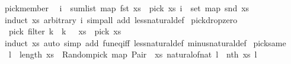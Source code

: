 \begin{isabellebody}
\isanewline
{}\isamarkupfalse%
\ pick{\isacharunderscore}{\kern0pt}member{\isacharcolon}{\kern0pt}\isanewline
\ \ {\isachardoublequoteopen}i\ {\isacharless}{\kern0pt}\ sum{\isacharunderscore}{\kern0pt}list\ {\isacharparenleft}{\kern0pt}map\ fst\ xs{\isacharparenright}{\kern0pt}\ {\isasymLongrightarrow}\ pick\ xs\ i\ {\isasymin}\ set\ {\isacharparenleft}{\kern0pt}map\ snd\ xs{\isacharparenright}{\kern0pt}{\isachardoublequoteclose}\isanewline
%
\isadelimproof
\ \ %
\endisadelimproof
%
\isatagproof
{}\isamarkupfalse%
\ {\isacharparenleft}{\kern0pt}induct\ xs\ arbitrary{\isacharcolon}{\kern0pt}\ i{\isacharparenright}{\kern0pt}\ {\isacharparenleft}{\kern0pt}simp{\isacharunderscore}{\kern0pt}all\ add{\isacharcolon}{\kern0pt}\ less{\isacharunderscore}{\kern0pt}natural{\isacharunderscore}{\kern0pt}def{\isacharparenright}{\kern0pt}%
\endisatagproof
{\isafoldproof}%
%
\isadelimproof
\isanewline
%
\endisadelimproof
\isanewline
{}\isamarkupfalse%
\ pick{\isacharunderscore}{\kern0pt}drop{\isacharunderscore}{\kern0pt}zero{\isacharcolon}{\kern0pt}\isanewline
\ \ {\isachardoublequoteopen}pick\ {\isacharparenleft}{\kern0pt}filter\ {\isacharparenleft}{\kern0pt}{\isasymlambda}{\isacharparenleft}{\kern0pt}k{\isacharcomma}{\kern0pt}\ {\isacharunderscore}{\kern0pt}{\isacharparenright}{\kern0pt}{\isachardot}{\kern0pt}\ k\ {\isachargreater}{\kern0pt}\ {}{\isacharparenright}{\kern0pt}\ xs{\isacharparenright}{\kern0pt}\ {\isacharequal}{\kern0pt}\ pick\ xs{\isachardoublequoteclose}\isanewline
%
\isadelimproof
\ \ %
\endisadelimproof
%
\isatagproof
{}\isamarkupfalse%
\ {\isacharparenleft}{\kern0pt}induct\ xs{\isacharparenright}{\kern0pt}\ {\isacharparenleft}{\kern0pt}auto\ simp\ add{\isacharcolon}{\kern0pt}\ fun{\isacharunderscore}{\kern0pt}eq{\isacharunderscore}{\kern0pt}iff\ less{\isacharunderscore}{\kern0pt}natural{\isacharunderscore}{\kern0pt}def\ minus{\isacharunderscore}{\kern0pt}natural{\isacharunderscore}{\kern0pt}def{\isacharparenright}{\kern0pt}%
\endisatagproof
{\isafoldproof}%
%
\isadelimproof
\isanewline
%
\endisadelimproof
\isanewline
{}\isamarkupfalse%
\ pick{\isacharunderscore}{\kern0pt}same{\isacharcolon}{\kern0pt}\isanewline
\ \ {\isachardoublequoteopen}l\ {\isacharless}{\kern0pt}\ length\ xs\ {\isasymLongrightarrow}\ Random{\isachardot}{\kern0pt}pick\ {\isacharparenleft}{\kern0pt}map\ {\isacharparenleft}{\kern0pt}Pair\ {}{\isacharparenright}{\kern0pt}\ xs{\isacharparenright}{\kern0pt}\ {\isacharparenleft}{\kern0pt}natural{\isacharunderscore}{\kern0pt}of{\isacharunderscore}{\kern0pt}nat\ l{\isacharparenright}{\kern0pt}\ {\isacharequal}{\kern0pt}\ nth\ xs\ l{\isachardoublequoteclose}\isanewline

\end{isabellebody}
